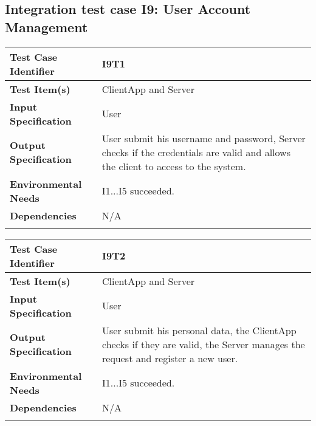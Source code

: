 

\subsection{Integration test case I9: User Account Management}

\begin{center}
\begin{tabular*}
{\textwidth}
{l p{10.5cm}}

\hline
\textbf{Test Case Identifier} & I9T1 \\
\hline
\textbf{Test Item(s)} & ClientApp and Server \\
\hline
\textbf{Input Specification} & User\\
\hline
\textbf{Output Specification} & User submit his username and password, Server checks if the credentials are valid and allows the client to access to the system.   \\
\hline
\textbf{Environmental Needs} & I1...I5 succeeded. \\
\hline
\textbf{Dependencies} & N/A \\
\hline
\newline
\newline
\end{tabular*}
\end{center}

\begin{center}
\begin{tabular*}
{\textwidth}
{l p{10.5cm}}

\hline
\textbf{Test Case Identifier} & I9T2 \\
\hline
\textbf{Test Item(s)} & ClientApp and Server \\
\hline
\textbf{Input Specification} & User\\
\hline
\textbf{Output Specification} & User submit his personal data, the ClientApp checks if they are valid, the Server manages the request and register a new user.  \\
\hline
\textbf{Environmental Needs} &I1...I5 succeeded. \\
\hline
\textbf{Dependencies} & N/A \\
\hline
\newline
\newline
\end{tabular*}
\end{center}


